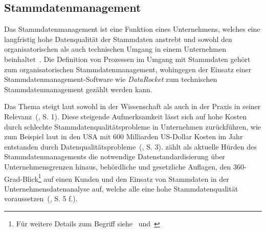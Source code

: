 \documentclass[
  language=german, %
  type=bachelor%
]{isthesis}
\begin{document}
\begin{content}



  \section{Stammdatenmanagement}
	Das Stammdatenmanagement ist eine Funktion eines Unternehmens, welches eine
	langfristig hohe Datenqualität der Stammdaten anstrebt und sowohl den
	organisatorischen als auch technischen Umgang in einem Unternehmen
	beinhaltet~\cite[][S.  2]{legner2007stammdaten}.  Die Definition von
	Prozessen im Umgang mit Stammdaten gehört \zB{} zum organisatorischen
	Stammdatenmanagement, wohingegen der Einsatz einer Stammdatenmanagement-Software
	wie \textit{DataRocket} zum technischen Stammdatenmanagement gezählt werden
	kann.  

  Das Thema steigt laut \textsc{\citeauthor{otto2012design}} sowohl in der
  Wissenschaft als auch in der Praxis in seiner
  Relevanz~(\citeyear{otto2012design}, S. 1). Diese steigende Aufmerksamkeit
  lässt sich auf hohe Kosten durch schlechte Stammdatenqualitätsprobleme in
  Unternehmen zurückführen, wie zum Beispiel laut
  \textsc{\citeauthor{eckerson2002data}} in den USA mit 600 Milliarden
  US-Dollar Kosten im Jahr entstanden durch
  Datenqualitätsprobleme~(\cite{eckerson2002data}, S. 3).
  \textsc{\citeauthor{otto2011stammdatenmanagement}} zählt als aktuelle Hürden
  des Stammdatenmanagements die notwendige Datenstandardisierung über
  Unternehmensgrenzen hinaus, behördliche und gesetzliche Auflagen, den
  360-Grad-Blick\footnote{Für weitere Details zum Begriff
  siehe~\cite{kotorov2003customer} und~\cite{otto2016master}} auf einen Kunden
  und den Einsatz von Stammdaten in der Unternehmensdatenanalyse auf, welche
  alle eine hohe Stammdatenqualität
  voraussetzen~(\citeyear{otto2011stammdatenmanagement}, S. 5 f.).


\end{content}
\end{document}

